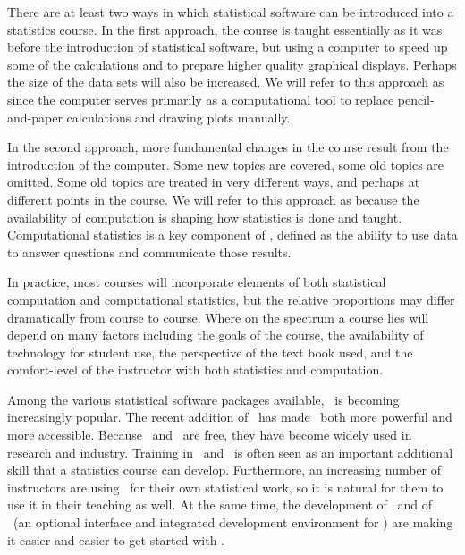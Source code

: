 \documentclass{tufte-book}\usepackage[]{graphicx}\usepackage[]{xcolor}
\begin{document}
There are at least two ways in which statistical software
can be introduced into a statistics course.  In the first approach, the course
is taught essentially as it was before the introduction of statistical 
software, but using a computer to speed up some of the calculations and 
to prepare higher quality graphical displays.  Perhaps the size of the 
data sets will also be increased.   We will refer to this approach as 
since the computer serves primarily as a computational
tool to replace pencil-and-paper calculations and drawing plots manually.

In the second approach, more fundamental changes in the course result from the introduction of the computer.  Some new topics are covered, some old topics are omitted.  Some old topics are treated in very different ways, and perhaps at different points in the course.  We will refer to this approach as  because the availability of computation is shaping how statistics is done and taught.  Computational statistics is a key component of , defined as the ability to use data to answer questions and communicate those results.

%
In practice, most courses will incorporate elements of both 
statistical computation and computational statistics, but the relative 
proportions may differ dramatically from course to course.
Where on the spectrum a course lies will depend
on many factors including 
the goals of the course, 
the availability of technology for student use, 
the perspective of the text book used,
and the comfort-level 
of the instructor with both statistics and computation.


Among the various statistical software packages available, \R\ is becoming
increasingly popular.  The recent addition of \RStudio\ has made \R\ both
more powerful and more accessible.
Because \R\ and \RStudio\ are free, they
have become widely
used in research and industry. Training in \R\ and \RStudio\ is often seen as an 
important additional skill that a statistics course can develop.  Furthermore,
an increasing number of instructors are using \R\ for their own statistical
work, so it is natural for them to use it in their teaching as well.
At the same time, the development of \R\ and of \RStudio\ (an optional 
interface and integrated development environment for \R) are making it
easier and easier to get started with \R.
\end{document}
